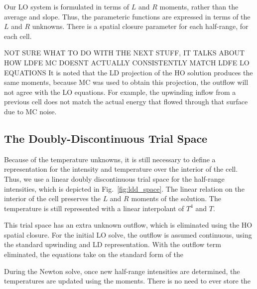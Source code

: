 Our LO system is formulated in terms of $L$ and $R$ moments, rather than the average and
slope.  Thus, the parameteric functions are expressed in terms of the $L$ and $R$
unknowns.  There is a spatial closure parameter for each half-range, for each cell.

NOT SURE WHAT TO DO WITH THE NEXT STUFF, IT TALKS ABOUT HOW LDFE MC DOESNT ACTUALLY
CONSISTENTLY MATCH LDFE LO EQUATIONS
It is noted that the LD projection of the HO solution produces the same moments, because
MC was used to obtain this projection, the outflow will not agree with the LO equations.
For example, the upwinding inflow from a previous cell does not match the actual energy
that flowed through that surface due to MC noise.

\subsection{The Doubly-Discontinuous Trial Space}

Because of the temperature unknowns, it is still necessary to define a representation for
the intensity and temperature over the interior of the cell.  Thus, we use a linear doubly
discontinuous trial space for the half-range intensities, which is depicted in Fig.~\ref{fig:ldd_space}.
The linear relation on the interior of the cell preserves the $L$ and $R$ moments of the
solution.  The temperature is still represented with a linear interpolant of $T^4$ and
$T$.  

This trial space has an extra unknown outflow, which is eliminated using the HO spatial
closure.  For the initial LO solve, the outflow is assumed continuous, using the standard
upwinding and LD representation.  With the outflow term eliminated, the equations take on
the standard form of the 

During the Newton solve, once new half-range
intensities are determined, the temperatures are updated using the moments.  There is no
need to ever store the 



